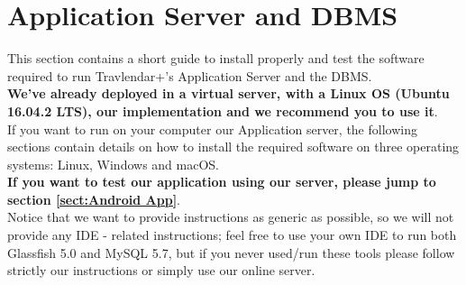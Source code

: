 \section{Application Server and DBMS}
\label{sect:Application Server and DBMS}
This section contains a short guide to install properly and test the software required to run Travlendar+'s Application Server and the DBMS.\\
{\large \textbf{We've already deployed in a virtual server, with a Linux OS (Ubuntu 16.04.2 LTS), our implementation and we recommend you to use it}}.\\
If you want to run on your computer our Application server, the following sections contain details on how to install the required software on three operating systems: Linux, Windows and macOS.\\
{\large \textbf{If you want to test our application using our server, please jump to section  \ref{sect:Android App}}}.\\
Notice that we want to provide instructions as generic as possible, so we will not provide any IDE - related instructions; feel free to use your own IDE to run both Glassfish 5.0 and MySQL 5.7, but if you never used/run these tools please follow strictly our instructions or simply use our online server.
